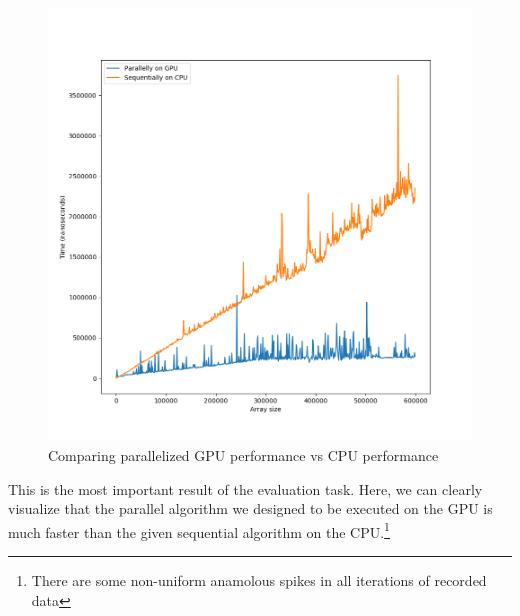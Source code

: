 \documentclass{article}
\begin{document}
\begin{figure}[H]
\hfill\includegraphics[scale=0.5]{Graphics/gpuvcpu.png}\hspace*{\fill}
\caption{Comparing parallelized GPU performance vs CPU performance}
\end{figure}
This is the most important result of the evaluation task. Here, we can clearly visualize that the parallel algorithm we designed to be executed on the GPU is much faster than the given sequential algorithm on the CPU.\footnote{There are some non-uniform anamolous spikes in all iterations of recorded data}
\end{document}
